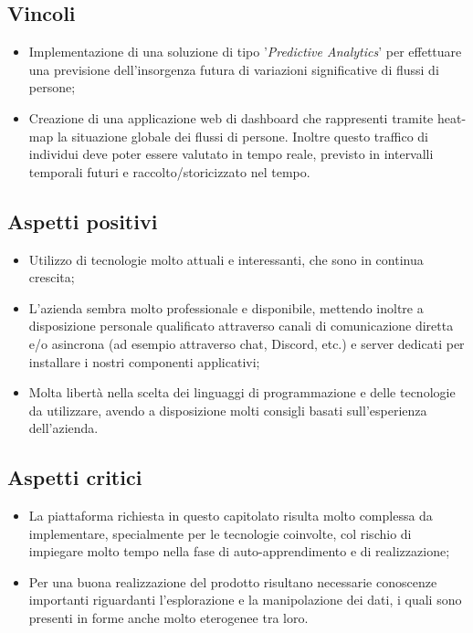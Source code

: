 \subsection{Vincoli}{
\begin{itemize}
\item Implementazione di una soluzione di tipo '\textit{Predictive Analytics}' per effettuare una previsione dell'insorgenza futura di variazioni significative di flussi di persone;
\item Creazione di una applicazione web di dashboard che rappresenti tramite heat-map la situazione globale dei flussi di persone. Inoltre questo traffico di individui deve poter essere valutato in tempo reale, previsto in intervalli temporali futuri e raccolto/storicizzato nel tempo.
\end{itemize}
}

\subsection{Aspetti positivi}{
\begin{itemize}
\item Utilizzo di tecnologie molto attuali e interessanti, che sono in continua crescita;
\item L'azienda sembra molto professionale e disponibile, mettendo inoltre a disposizione personale qualificato attraverso canali di comunicazione diretta e/o asincrona (ad esempio attraverso chat, Discord, etc.) e server dedicati per installare i nostri componenti applicativi;
\item Molta libertà nella scelta dei linguaggi di programmazione e delle tecnologie da utilizzare, avendo a disposizione molti consigli basati sull'esperienza dell'azienda.
\end{itemize}
}

\subsection{Aspetti critici}{
\begin{itemize}
\item La piattaforma richiesta in questo capitolato risulta molto complessa da implementare, specialmente per le tecnologie coinvolte, col rischio di impiegare molto tempo nella fase di auto-apprendimento e di realizzazione;
\item Per una buona realizzazione del prodotto risultano necessarie conoscenze importanti riguardanti l'esplorazione e la manipolazione dei dati, i quali sono presenti in forme anche molto eterogenee tra loro.
\end{itemize}
}

